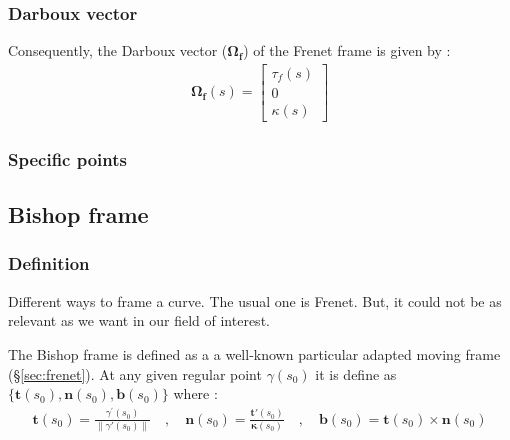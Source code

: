 \subsubsection{Darboux vector}
Consequently, the Darboux vector ($\mathbf{\Omega_{f}}$) of the Frenet frame is given by :
\begin{gather}
\mathbf{\Omega_f}(s) 
= 
\left[\begin{array}{c}
\tau_{f}(s) \\
0 \\
\kappa(s)
\end{array}\right]
\end{gather}

\subsubsection{Specific points}


\subsection{Bishop frame}

\subsubsection{Definition}
Different ways to frame a curve. The usual one is Frenet. But, it could not be as relevant as we want in our field of interest.

The Bishop frame is defined as a a well-known particular adapted moving frame (§\ref{sec:frenet}). At any given regular point $\gamma(s_0)$ it is define as $\{\mathbf{t}(s_0),\mathbf{n}(s_0),\mathbf{b}(s_0)\}$ where : 
\begin{gather}
\mathbf{t}(s_0) = \frac{\gamma^{'}(s_0)}{\|\gamma'(s_0)\|}
\quad,\quad
\mathbf{n}(s_0) = \frac{\mathbf{t'}(s_0)}{\mathbf{\kappa}(s_0)}
\quad,\quad
\mathbf{b}(s_0)= \mathbf{t}(s_0)\times\mathbf{n}(s_0)
\end{gather}

